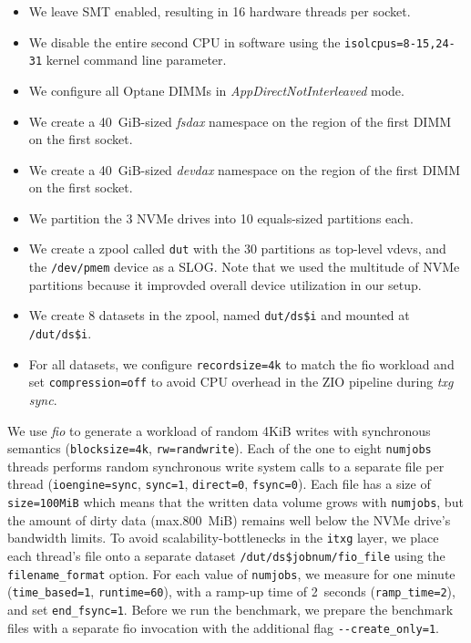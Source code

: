 \documentclass[12pt,a4paper,twoside]{book}
\begin{document}
\begin{itemize}[noitemsep]
    \item We leave SMT enabled, resulting in 16 hardware threads per socket.
    \item We disable the entire second CPU in software using the \lstinline{isolcpus=8-15,24-31} kernel command line parameter.
    \item We configure all Optane DIMMs in \textit{AppDirectNotInterleaved} mode.
    \item We create a \SI{40}{GiB}-sized \textit{fsdax} namespace on the region of the first DIMM on the first socket.
    \item We create a \SI{40}{GiB}-sized \textit{devdax} namespace on the region of the first DIMM on the first socket.
    \item We partition the 3 NVMe drives into 10 equals-sized partitions each.
    \item We create a zpool called \texttt{dut} with the 30 partitions as top-level vdevs, and the \texttt{/dev/pmem} device as a SLOG.
        Note that we used the multitude of NVMe partitions because it improvded overall device utilization in our setup.
    \item We create 8 datasets in the zpool, named \lstinline{dut/ds$i} and mounted at \lstinline{/dut/ds$i}.
    \item For all datasets, we configure \lstinline{recordsize=4k} to match the fio workload and set \lstinline{compression=off} to avoid CPU overhead in the ZIO pipeline during \textit{txg sync}.
\end{itemize}

We use \textit{fio} to generate a workload of random 4KiB writes with synchronous semantics (\lstinline{blocksize=4k}, \lstinline{rw=randwrite}).
Each of the one to eight \lstinline{numjobs} threads performs random synchronous write system calls to a separate file per thread (\lstinline{ioengine=sync}, \lstinline{sync=1}, \lstinline{direct=0}, \lstinline{fsync=0}).
Each file has a size of \lstinline{size=100MiB} which means that the written data volume grows with \lstinline{numjobs}, but the amount of dirty data (max.\SI{800}{MiB}) remains well below the NVMe drive's bandwidth limits.
To avoid scalability-bottlenecks in the \lstinline{itxg} layer, we place each thread's file onto a separate dataset \lstinline{/dut/ds$jobnum/fio_file} using the \lstinline{filename_format} option.
For each value of \lstinline{numjobs}, we measure for one minute (\lstinline{time_based=1}, \lstinline{runtime=60}), with a ramp-up time of \SI{2}{seconds} (\lstinline{ramp_time=2}), and set \lstinline{end_fsync=1}.
Before we run the benchmark, we prepare the benchmark files with a separate fio invocation with the additional flag \lstinline{--create_only=1}.
\end{document}
